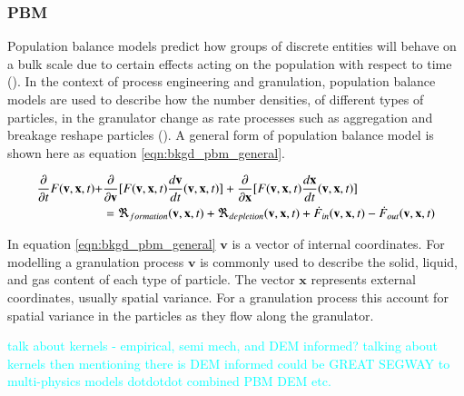 \documentclass[preprint,11pt,authoryear]{elsarticle}
\begin{document}
	    \subsubsection{PBM}
	    \par Population balance models predict how groups of discrete entities will behave on a bulk scale due to certain effects acting on the population with respect to time (\cite{ramkrishna2014}). In the context of process engineering and granulation, population balance models are used to describe how the number densities, of different types of particles, in the granulator change as rate processes such as aggregation and breakage reshape particles (\cite{Barrasso2013}). A general form of population balance model is shown here as equation \ref{eqn:bkgd_pbm_general}.
	    
	    \begin{align}
	    \frac{ \partial}{\partial t}F(\textbf{v},\textbf{x},t) +& \frac{\partial}{\partial \textbf{v}}[F(\textbf{v},\textbf{x},t)\frac{d\textbf{v}}{dt}(\textbf{v},\textbf{x},t)] + \frac{\partial}{\partial \textbf{x}}[F(\textbf{v},\textbf{x},t)\frac{d\textbf{x}}{dt}(\textbf{v},\textbf{x},t)] \notag\\
	    &= \Re_{formation}(\textbf{v},\textbf{x},t)+\Re_{depletion}(\textbf{v},\textbf{x},t)+\dot{F}_{in}(\textbf{v},\textbf{x},t)-\dot{F}_{out}(\textbf{v},\textbf{x},t)
	    \label{eqn:bkgd_pbm_general} 
	    \end{align}
	    
    \par In equation \ref{eqn:bkgd_pbm_general} $\textbf{v}$ is a vector of internal coordinates. For modelling a granulation process $\textbf{v}$ is commonly used to describe the solid, liquid, and gas content of each type of particle. The vector $\textbf{x}$ represents external coordinates, usually spatial variance. For a granulation process this  account for spatial variance in the particles as they flow along the granulator. 
	    \par \textcolor{cyan}{talk about kernels - empirical, semi mech, and DEM informed? talking about kernels then mentioning there is DEM informed could be GREAT SEGWAY to multi-physics models dotdotdot combined PBM DEM etc.}
	    
	
\end{document}
